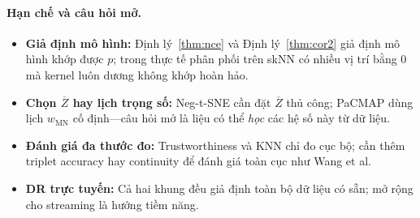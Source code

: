 \paragraph{Hạn chế và câu hỏi mở.}
\begin{itemize}
  \item \textbf{Giả định mô hình:} Định lý~\ref{thm:nce} và Định lý~\ref{thm:cor2} giả định mô hình khớp được $p$; trong thực tế phân phối trên skNN có nhiều vị trí bằng 0 mà kernel luôn dương không khớp hoàn hảo.
  \item \textbf{Chọn $\overline{Z}$ hay lịch trọng số:} Neg-t-SNE cần đặt $\overline{Z}$ thủ công; PaCMAP dùng lịch $w_{\text{MN}}$ cố định---câu hỏi mở là liệu có thể \emph{học} các hệ số này từ dữ liệu.
  \item \textbf{Đánh giá đa thước đo:} Trustworthiness và KNN chỉ đo cục bộ; cần thêm triplet accuracy hay continuity để đánh giá toàn cục như Wang et al.
  \item \textbf{DR trực tuyến:} Cả hai khung đều giả định toàn bộ dữ liệu có sẵn; mở rộng cho streaming là hướng tiềm năng.
\end{itemize}

\FloatBarrier
